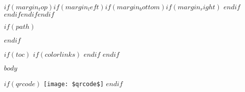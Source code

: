 \documentclass[a4paper,11pt]{article}
\begin{document}
$if(margin_top)$$if(margin_left)$$if(margin_bottom)$$if(margin_right)$
		$endif$$endif$$endif$$endif$

$if(path)$
		
	$endif$

	$if(toc)$
		{
				$if(colorlinks)$
				\hypersetup{linkcolor=$if(toccolor)$$toccolor$$else$$endif$}
				$endif$
				\setcounter{secnumdepth}{3}
				\setcounter{tocdepth}{$toc_depth$}
				\tableofcontents
			}
	$endif$

		\newpage
	$body$
		\vspace{10mm}

	$if(qrcode)$
		\texttt{[image: \$qrcode\$]}
	$endif$
\end{document}

